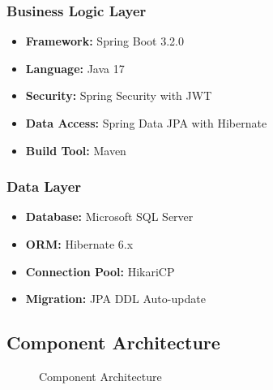 \documentclass[12pt,a4paper]{article}
\begin{document}
\subsubsection{Business Logic Layer}
\begin{itemize}
    \item \textbf{Framework:} Spring Boot 3.2.0
    \item \textbf{Language:} Java 17
    \item \textbf{Security:} Spring Security with JWT
    \item \textbf{Data Access:} Spring Data JPA with Hibernate
    \item \textbf{Build Tool:} Maven
\end{itemize}

\subsubsection{Data Layer}
\begin{itemize}
    \item \textbf{Database:} Microsoft SQL Server
    \item \textbf{ORM:} Hibernate 6.x
    \item \textbf{Connection Pool:} HikariCP
    \item \textbf{Migration:} JPA DDL Auto-update
\end{itemize}

\subsection{Component Architecture}

\begin{figure}[H]
\centering
{}
\caption{Component Architecture}
\label{fig:component-diagram}
\end{figure}
\end{document}
